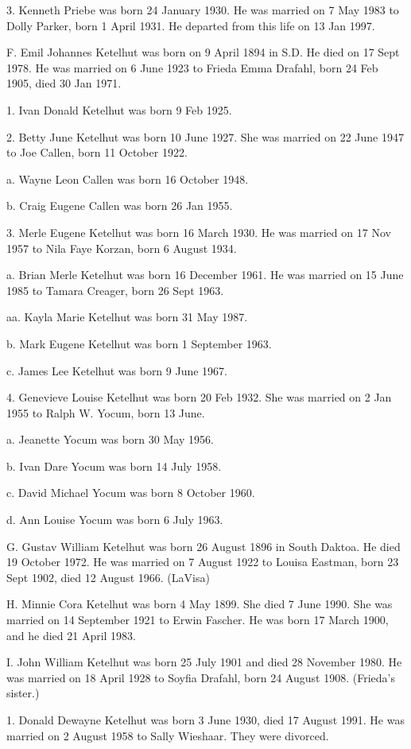 \documentclass[a4paper]{article}
\begin{document}
3.  Kenneth Priebe was born 24 January 1930.  He was married on 7 May 1983 to Dolly Parker, born 1 April 1931.  He departed from this life on 13 Jan 1997.

F. Emil Johannes Ketelhut was born on 9 April 1894 in S.D.  He died on 17 Sept 1978. He was married on 6 June 1923 to Frieda Emma Drafahl, born 24 Feb 1905, died 30 Jan 1971.

1. Ivan Donald Ketelhut was born 9 Feb 1925.

2. Betty June Ketelhut was born 10 June 1927.  She was married on 22 June 1947 to Joe Callen, born 11 October 1922.

a. Wayne Leon Callen was born 16 October 1948.

b. Craig Eugene Callen was born 26 Jan 1955.

3. Merle Eugene Ketelhut was born 16 March 1930. He was married on 17 Nov 1957 to Nila Faye Korzan, born 6 August 1934.

a. Brian Merle Ketelhut was born 16 December 1961.  He was married on 15 June 1985 to Tamara Creager, born 26 Sept 1963.

aa. Kayla Marie Ketelhut was born 31 May 1987.

b. Mark Eugene Ketelhut was born 1 September 1963.

c. James Lee Ketelhut was born 9 June 1967.

4. Genevieve Louise Ketelhut was born 20 Feb 1932.  She was married on 2 Jan 1955 to Ralph W. Yocum, born 13 June.

a. Jeanette Yocum was born 30 May 1956.

b. Ivan Dare Yocum was born 14 July 1958.

c. David Michael Yocum was born 8 October 1960.

d. Ann Louise Yocum was born 6 July 1963.

G. Gustav William Ketelhut was born 26 August 1896 in South Daktoa.  He died 19 October 1972.  He was married on 7 August 1922 to Louisa Eastman, born 23 Sept 1902, died 12 August 1966. (LaVisa)

H.  Minnie Cora Ketelhut was born 4 May 1899.  She died 7 June 1990.  She was married on 14 September 1921 to Erwin Fascher.  He was born 17 March 1900, and he died 21 April 1983.

I. John William Ketelhut was born 25 July 1901 and died 28 November 1980.  He was married on 18 April 1928 to Soyfia Drafahl, born 24 August 1908.  (Frieda's sister.)

1. Donald Dewayne Ketelhut was born 3 June 1930, died 17 August 1991.  He was married on 2 August 1958 to Sally Wieshaar.  They were divorced.
\end{document}
